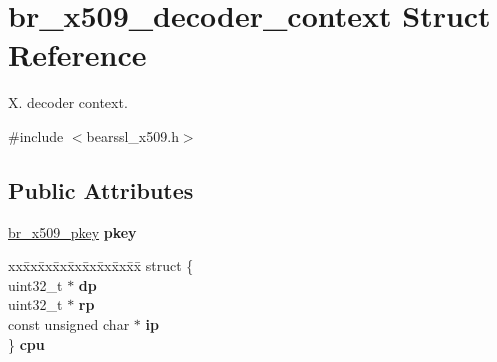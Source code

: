 \hypertarget{structbr__x509__decoder__context}{}\section{br\+\_\+x509\+\_\+decoder\+\_\+context Struct Reference}
\label{structbr__x509__decoder__context}


X. decoder context.  




{\ttfamily \#include $<$bearssl\+\_\+x509.\+h$>$}

\subsection*{Public Attributes}
\begin{DoxyCompactItemize}
\item 
\mbox{\label{structbr__x509__decoder__context_a3e24f8a8aeac3e8dd5321f37cd86f96a}} 
\hyperlink{structbr__x509__pkey}{br\+\_\+x509\+\_\+pkey} {\bfseries pkey}
\item 
\mbox{\label{structbr__x509__decoder__context_a2e037fec7266eaf531f4ee51d85f48da}} 
\begin{tabbing}
xx\=xx\=xx\=xx\=xx\=xx\=xx\=xx\=xx\=\kill
struct \{\\
\>uint32\_t $\ast$ {\bfseries dp}\\
\>uint32\_t $\ast$ {\bfseries rp}\\
\>const unsigned char $\ast$ {\bfseries ip}\\
\} {\bfseries cpu}\\


\end{tabbing}
\end{DoxyCompactItemize}
